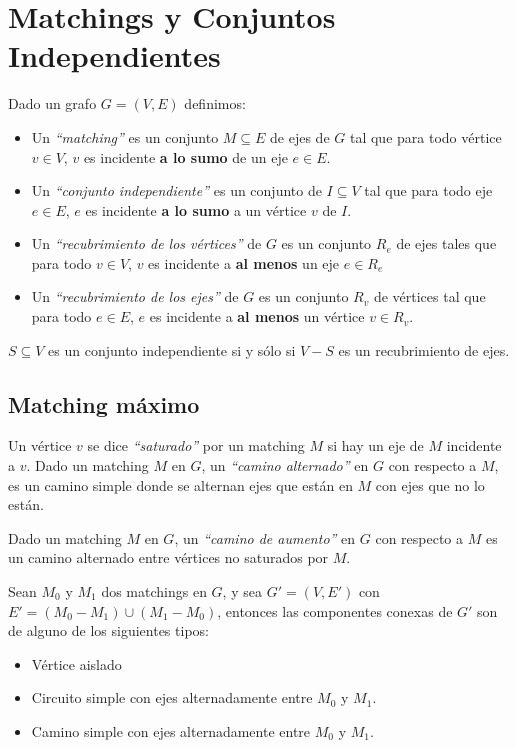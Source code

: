\newpage
\section{Matchings y Conjuntos Independientes}

Dado un grafo $G = (V, E)$ definimos:

\begin{itemize}
\item Un \emph{``matching''} es un conjunto $M \subseteq E$ de ejes de $G$ tal que para todo v\'ertice $v \in V$, $v$ es incidente \textbf{a lo sumo} de un eje $e \in E$.
\item Un \emph{``conjunto independiente''} es un conjunto de $I \subseteq V$ tal que para todo eje $e \in E$, $e$ es incidente \textbf{a lo sumo} a un v\'ertice $v$ de $I$.
\item Un \emph{``recubrimiento de los v\'ertices''} de $G$ es un conjunto $R_e$ de ejes tales que para todo $v \in V$, $v$ es incidente a \textbf{al menos} un eje $e \in R_e$
\item Un \emph{``recubrimiento de los ejes''} de $G$ es un conjunto $R_v$ de v\'ertices tal que para todo $e \in E$, $e$ es incidente a \textbf{al menos} un v\'ertice $v \in R_v$.
\end{itemize}

$S \subseteq V$ es un conjunto independiente si y s\'olo si $V - S$ es un recubrimiento de ejes.

\subsection{Matching m\'aximo}

Un v\'ertice $v$ se dice \emph{``saturado''} por un matching $M$ si hay un eje de $M$ incidente a $v$. Dado un matching $M$ en $G$, un \emph{``camino alternado''} en $G$ con respecto a $M$, es un camino simple donde se alternan ejes que est\'an en $M$ con ejes que no lo est\'an.

Dado un matching $M$ en $G$, un \emph{``camino de aumento''} en $G$ con respecto a $M$ es un camino alternado entre v\'ertices no saturados por $M$.

Sean $M_0$ y $M_1$ dos matchings en $G$, y sea $G' = (V, E')$ con $E' = (M_0 - M_1) \cup (M_1 - M_0)$, entonces las componentes conexas de $G'$ son de alguno de los siguientes tipos:

\begin{itemize}
\item V\'ertice aislado
\item Circuito simple con ejes alternadamente entre $M_0$ y $M_1$.
\item Camino simple con ejes alternadamente entre $M_0$ y $M_1$.
\end{itemize}


